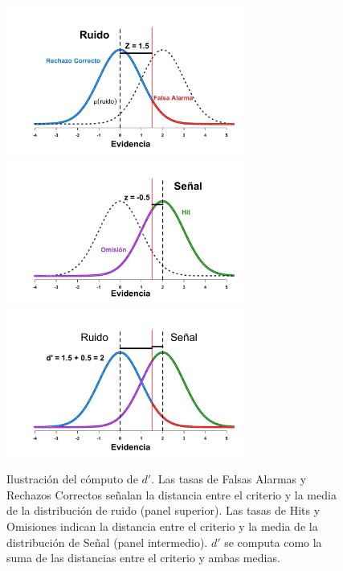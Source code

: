 \begin{itemize}
\begin{figure}[p]
\centering
\includegraphics[width=0.70\textwidth]{Figures/dR_1}\\ 
\includegraphics[width=0.70\textwidth]{Figures/dR_2}\\
\includegraphics[width=0.70\textwidth]{Figures/dR_3}\\ 
\decoRule
\caption[Estimación paramétrica: la discriminabilidad ($d'$)]{Ilustración del cómputo de $d'$. Las tasas de Falsas Alarmas y Rechazos Correctos señalan la distancia entre el criterio y la media de la distribución de ruido (panel superior). Las tasas de Hits y Omisiones indican la distancia entre el criterio y la media de la distribución de Señal (panel intermedio). $d'$ se computa como la suma de las distancias entre el criterio y ambas medias.}
\label{fig:Graf_Discrim}
\end{figure}


\end{itemize}
